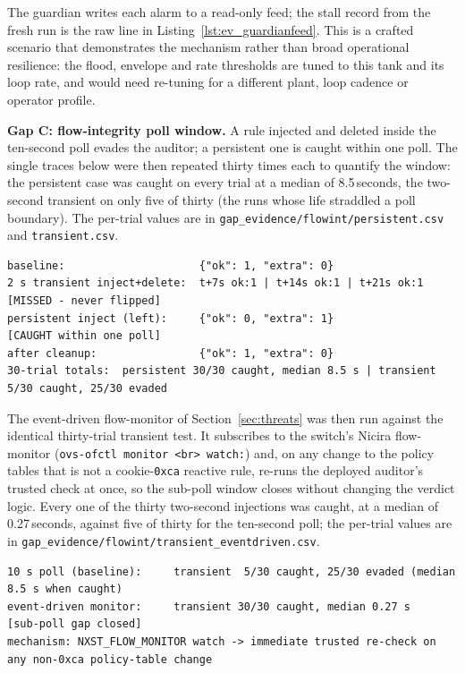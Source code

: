 The guardian writes each alarm to a read-only feed; the stall record from the fresh run is the raw line in Listing~\ref{lst:ev_guardianfeed}. This is a crafted scenario that demonstrates the mechanism rather than broad operational resilience: the flood, envelope and rate thresholds are tuned to this tank and its loop rate, and would need re-tuning for a different plant, loop cadence or operator profile.


\noindent\textbf{Gap C: flow-integrity poll window.} A rule injected and deleted inside the ten-second poll evades the auditor; a persistent one is caught within one poll. The single traces below were then repeated thirty times each to quantify the window: the persistent case was caught on every trial at a median of 8.5\,seconds, the two-second transient on only five of thirty (the runs whose life straddled a poll boundary). The per-trial values are in \texttt{gap\_evidence/flowint/persistent.csv} and \texttt{transient.csv}.
\begin{lstlisting}[style=carsdump,caption={Gap C: transient (mostly missed) versus persistent (always caught) flow-integrity status, with the thirty-trial totals.},label={lst:ev_poll}]
baseline:                     {"ok": 1, "extra": 0}
2 s transient inject+delete:  t+7s ok:1 | t+14s ok:1 | t+21s ok:1     [MISSED - never flipped]
persistent inject (left):     {"ok": 0, "extra": 1}                   [CAUGHT within one poll]
after cleanup:                {"ok": 1, "extra": 0}
30-trial totals:  persistent 30/30 caught, median 8.5 s | transient 5/30 caught, 25/30 evaded
\end{lstlisting}

The event-driven flow-monitor of Section~\ref{sec:threats} was then run against the identical thirty-trial transient test. It subscribes to the switch's Nicira flow-monitor (\texttt{ovs-ofctl monitor <br> watch:}) and, on any change to the policy tables that is not a cookie-\texttt{0xca} reactive rule, re-runs the deployed auditor's trusted check at once, so the sub-poll window closes without changing the verdict logic. Every one of the thirty two-second injections was caught, at a median of 0.27\,seconds, against five of thirty for the ten-second poll; the per-trial values are in \texttt{gap\_evidence/flowint/transient\_eventdriven.csv}.
\begin{lstlisting}[style=carsdump,caption={Gap C remedy: event-driven monitor on the same transient test.},label={lst:ev_poll_fix}]
10 s poll (baseline):     transient  5/30 caught, 25/30 evaded (median 8.5 s when caught)
event-driven monitor:     transient 30/30 caught, median 0.27 s   [sub-poll gap closed]
mechanism: NXST_FLOW_MONITOR watch -> immediate trusted re-check on any non-0xca policy-table change
\end{lstlisting}

